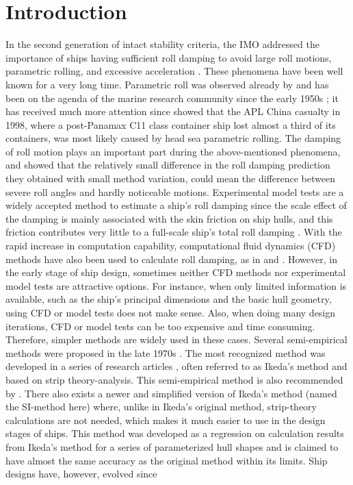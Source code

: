 \section{Introduction}
\label{se:introduction}

In the second generation of intact stability criteria, the IMO addressed the importance of ships having sufficient roll damping to avoid large roll motions, parametric rolling, and excessive acceleration \parencite{imo_finalization_2016}. These phenomena have been well known for a very long time. Parametric roll was observed already by \parencite{froude_rolling_1861} and has been on the agenda of the marine research community since the early 1950s \parencite{galeazzi_early_2013}; it has received much more attention since \parencite{france_investigation_2001} showed that the APL China casualty in 1998, where a post-Panamax C11 class container ship lost almost a third of its containers, was most likely caused by head sea parametric rolling. The damping of roll motion plays an important part during the above-mentioned phenomena, and  \parencite{soder_ikeda_2019} showed that the relatively small difference in the roll damping prediction they obtained with small method variation, could mean the difference between severe roll angles and hardly noticeable motions. Experimental model tests are a widely accepted method to estimate a ship’s roll damping since the scale effect of the damping is mainly associated with the skin friction on ship hulls, and this friction contributes very little to a full-scale ship’s total roll damping \parencite{imo_1200_2006}. With the rapid increase in computation capability, computational fluid dynamics (CFD) methods have also been used to calculate roll damping, as in  \parencite{kristiansen_experimental_2014} and \parencite{henry_peter_piehl_ship_2016}. However, in the early stage of ship design, sometimes neither CFD methods nor experimental model tests are attractive options. For instance, when only limited information is available, such as the ship’s principal dimensions and the basic hull geometry, using CFD or model tests does not make sense. Also, when doing many design iterations, CFD or model tests can be too expensive and time consuming. Therefore, simpler methods are widely used in these cases. Several semi-empirical methods were proposed in the late 1970s \parencite{himeno_prediction_1981}. The most recognized method was developed in a series of research articles \parencite{ikeda_roll_1978,ikeda_eddy_1978,ikeda_roll_1979,ikeda_components_1978,ikeda_velocity_1979}, often referred to as Ikeda’s method and based on strip theory-analysis. This semi-empirical method is also recommended by \parencite{ittc_ittc_2011}. There also exists a newer and simplified version of Ikeda’s method \parencite{kawahara_simple_2011}  (named the SI-method here) where, unlike in Ikeda’s original method, strip-theory calculations are not needed, which makes it much easier to use in the design stages of ships. This method was developed as a regression on calculation results from Ikeda’s method for a series of parameterized hull shapes and is claimed \parencite{kawahara_simple_2011} to have almost the same accuracy as the original method within its limits. Ship designs have, however, evolved since 